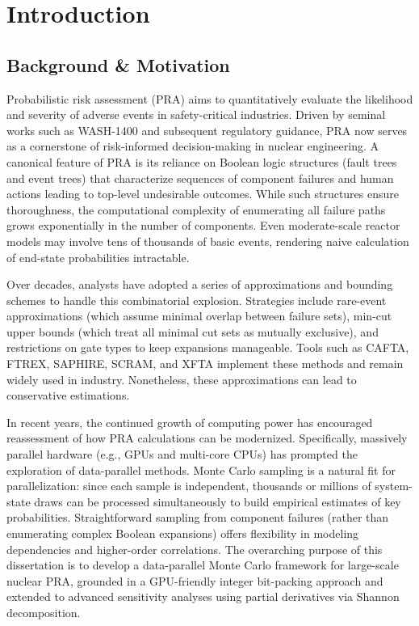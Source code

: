%

\chapter{Introduction}
\section{Background \& Motivation}
Probabilistic risk assessment (PRA) aims to quantitatively evaluate the likelihood and severity of adverse events in safety-critical industries. Driven by seminal works such as WASH-1400 and subsequent regulatory guidance, PRA now serves as a cornerstone of risk-informed decision-making in nuclear engineering. A canonical feature of PRA is its reliance on  Boolean logic structures (fault trees and event trees) that characterize sequences of component failures and human actions leading to top-level undesirable outcomes. While such structures ensure thoroughness, the computational complexity of enumerating all failure paths grows exponentially in the number of components. Even moderate-scale reactor models may involve tens of thousands of basic events, rendering naive calculation of end-state probabilities intractable.

Over decades, analysts have adopted a series of approximations and bounding schemes to handle this combinatorial explosion. Strategies include rare-event approximations (which assume minimal overlap between failure sets), min-cut upper bounds (which treat all minimal cut sets as mutually exclusive), and restrictions on gate types to keep expansions manageable. Tools such as CAFTA, FTREX, SAPHIRE, SCRAM, and XFTA implement these methods and remain widely used in industry. Nonetheless, these approximations can lead to conservative estimations.

In recent years, the continued growth of computing power has encouraged reassessment of how PRA calculations can be modernized. Specifically, massively parallel hardware (e.g., GPUs and multi-core CPUs) has prompted the exploration of data-parallel methods. Monte Carlo sampling is a natural fit for parallelization: since each sample is independent, thousands or millions of system-state draws can be processed simultaneously to build empirical estimates of key probabilities. Straightforward sampling from component failures (rather than enumerating complex Boolean expansions) offers flexibility in modeling dependencies and higher-order correlations. The overarching purpose of this dissertation is to develop a data-parallel Monte Carlo framework for large-scale nuclear PRA, grounded in a GPU-friendly integer bit-packing approach and extended to advanced sensitivity analyses using partial derivatives via Shannon decomposition.
